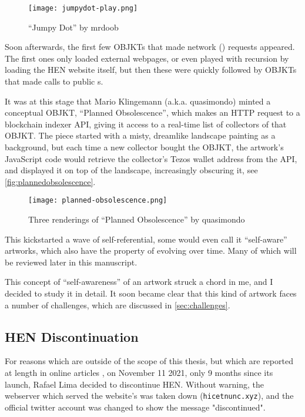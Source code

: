 \begin{figure}[H]
    \centering
    \texttt{[image: jumpydot-play.png]}
    \caption[``Jumpy Dot'' by mrdoob]{``Jumpy Dot'' by mrdoob}
    \label{fig:jumpydot}
\end{figure}


Soon afterwards, the first few OBJKTs that made network () requests appeared. The first ones only loaded external webpages, or even played with recursion by loading the HEN website itself, but then these were quickly followed by OBJKTs that made calls to public s.

It was at this stage that Mario Klingemann (a.k.a. quasimondo) minted a conceptual OBJKT, ``Planned Obsolescence'', which makes an HTTP request to a blockchain indexer API, giving it access to a real-time list of collectors of that OBJKT. The piece started with a misty, dreamlike landscape painting as a background, but each time a new collector bought the OBJKT, the artwork's JavaScript code would retrieve the collector's Tezos wallet address from the API, and displayed it on top of the landscape, increasingly obscuring it, see \autoref{fig:plannedobsolescence}.


\begin{figure}[H]
    \centering
    \texttt{[image: planned-obsolescence.png]}
    \caption[``Planned Obsolescence'' by quasimondo]{Three renderings of ``Planned Obsolescence'' by quasimondo}
    \label{fig:plannedobsolescence}
\end{figure}


This kickstarted a wave of self-referential, some would even call it ``self-aware'' artworks, which also have the property of evolving over time. Many of which will be reviewed later in this manuscript.

This concept of ``self-awareness'' of an artwork struck a chord in me, and I decided to study it in detail. It soon became clear that this kind of artwork faces a number of challenges, which are discussed in \autoref{sec:challenges}.


\subsection*{HEN Discontinuation}
\label{sub:teia}

For reasons which are outside of the scope of this thesis, but which are reported at length in online articles \cite{straeubigHENTimelineHentimeline2024} \cite{siqueiraHicNuncStory2021a} \cite{tezosHistoryTeiaArt2022} \cite{smithHicNuncPart2022}, on November 11 2021, only 9 months since its launch, Rafael Lima decided to discontinue HEN. Without warning, the webserver which served the website's  was taken down (\texttt{hicetnunc.xyz}), and the official twitter account was changed to show the message "discontinued".

